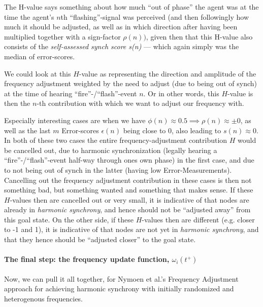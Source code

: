 	The H-value says something about how much ``out of phase'' the agent was at the time the agent's $n$th ``flashing''-signal was perceived (and then followingly how much it should be adjusted, as well as in which direction after having been multiplied together with a sign-factor $\rho(n))$, given then that this H-value also consists of the \textit{self-assessed synch score s(n)} — which again simply was the median of error-scores.

	We could look at this $H$-value as representing the direction and amplitude of the frequency adjustment weighted by the need to adjust (due to being out of synch) at the time of hearing ``fire''-/``flash''-event $n$. Or in other words, this $H$-value is then the $n$-th contribution with which we want to adjust our frequency with.

	Especially interesting cases are when we have $\phi(n)\approx0.5 \implies \rho(n)\approx\pm0$, as well as the last $m$ Error-scores $\epsilon(n)$ being close to 0, also leading to $s(n)\approx0$. In both of these two cases the entire frequency-adjustment contribution $H$ would be cancelled out, due to harmonic synchronization (legally hearing a ``fire''-/``flash''-event half-way through ones own phase) in the first case, and due to not being out of synch in the latter (having low Error-Measurements). Cancelling out the frequency adjustment contribution in these cases is then not something bad, but something wanted and something that makes sense. If these $H$-values then are cancelled out or very small, it is indicative of that nodes are already in \textit{harmonic synchrony}, and hence should not be ``adjusted away'' from this goal state. On the other side, if these $H$-values then are different (e.g. closer to -1 and 1), it is indicative of that nodes are not yet in \textit{harmonic synchrony}, and that they hence should be ``adjusted closer'' to the goal state.
	

	\paragraph{The final step: the frequency update function, $\omega_i(t^+)$}
	
		
		
	
	Now, we can pull it all together, for Nymoen et al.'s Frequency Adjustment approach for achieving harmonic synchrony with initially randomized and heterogenous frequencies.

